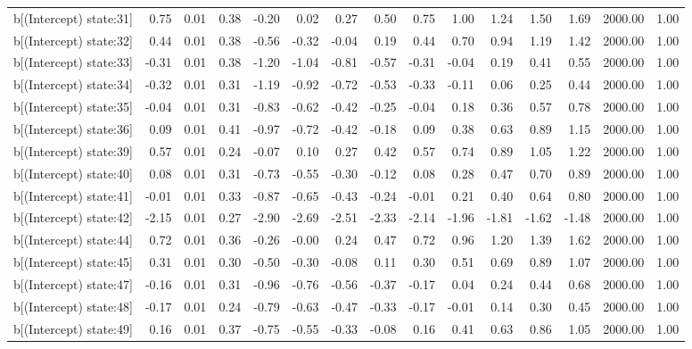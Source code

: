 \begin{table}[ht]
\begin{tabular}{rrrrrrrrrrrrrrr}
  b[(Intercept) state:31] & 0.75 & 0.01 & 0.38 & -0.20 & 0.02 & 0.27 & 0.50 & 0.75 & 1.00 & 1.24 & 1.50 & 1.69 & 2000.00 & 1.00 \\ 
  b[(Intercept) state:32] & 0.44 & 0.01 & 0.38 & -0.56 & -0.32 & -0.04 & 0.19 & 0.44 & 0.70 & 0.94 & 1.19 & 1.42 & 2000.00 & 1.00 \\ 
  b[(Intercept) state:33] & -0.31 & 0.01 & 0.38 & -1.20 & -1.04 & -0.81 & -0.57 & -0.31 & -0.04 & 0.19 & 0.41 & 0.55 & 2000.00 & 1.00 \\ 
  b[(Intercept) state:34] & -0.32 & 0.01 & 0.31 & -1.19 & -0.92 & -0.72 & -0.53 & -0.33 & -0.11 & 0.06 & 0.25 & 0.44 & 2000.00 & 1.00 \\ 
  b[(Intercept) state:35] & -0.04 & 0.01 & 0.31 & -0.83 & -0.62 & -0.42 & -0.25 & -0.04 & 0.18 & 0.36 & 0.57 & 0.78 & 2000.00 & 1.00 \\ 
  b[(Intercept) state:36] & 0.09 & 0.01 & 0.41 & -0.97 & -0.72 & -0.42 & -0.18 & 0.09 & 0.38 & 0.63 & 0.89 & 1.15 & 2000.00 & 1.00 \\ 
  b[(Intercept) state:39] & 0.57 & 0.01 & 0.24 & -0.07 & 0.10 & 0.27 & 0.42 & 0.57 & 0.74 & 0.89 & 1.05 & 1.22 & 2000.00 & 1.00 \\ 
  b[(Intercept) state:40] & 0.08 & 0.01 & 0.31 & -0.73 & -0.55 & -0.30 & -0.12 & 0.08 & 0.28 & 0.47 & 0.70 & 0.89 & 2000.00 & 1.00 \\ 
  b[(Intercept) state:41] & -0.01 & 0.01 & 0.33 & -0.87 & -0.65 & -0.43 & -0.24 & -0.01 & 0.21 & 0.40 & 0.64 & 0.80 & 2000.00 & 1.00 \\ 
  b[(Intercept) state:42] & -2.15 & 0.01 & 0.27 & -2.90 & -2.69 & -2.51 & -2.33 & -2.14 & -1.96 & -1.81 & -1.62 & -1.48 & 2000.00 & 1.00 \\ 
  b[(Intercept) state:44] & 0.72 & 0.01 & 0.36 & -0.26 & -0.00 & 0.24 & 0.47 & 0.72 & 0.96 & 1.20 & 1.39 & 1.62 & 2000.00 & 1.00 \\ 
  b[(Intercept) state:45] & 0.31 & 0.01 & 0.30 & -0.50 & -0.30 & -0.08 & 0.11 & 0.30 & 0.51 & 0.69 & 0.89 & 1.07 & 2000.00 & 1.00 \\ 
  b[(Intercept) state:47] & -0.16 & 0.01 & 0.31 & -0.96 & -0.76 & -0.56 & -0.37 & -0.17 & 0.04 & 0.24 & 0.44 & 0.68 & 2000.00 & 1.00 \\ 
  b[(Intercept) state:48] & -0.17 & 0.01 & 0.24 & -0.79 & -0.63 & -0.47 & -0.33 & -0.17 & -0.01 & 0.14 & 0.30 & 0.45 & 2000.00 & 1.00 \\ 
  b[(Intercept) state:49] & 0.16 & 0.01 & 0.37 & -0.75 & -0.55 & -0.33 & -0.08 & 0.16 & 0.41 & 0.63 & 0.86 & 1.05 & 2000.00 & 1.00 \\ 

\end{tabular}
\end{table}
